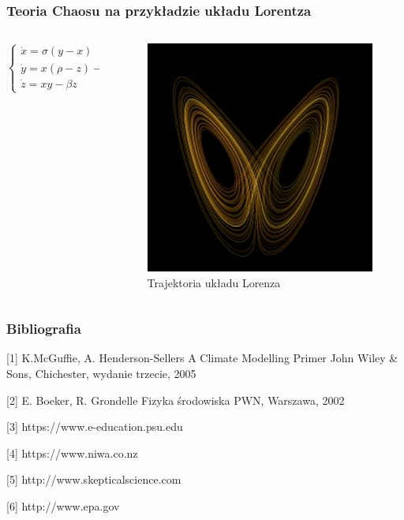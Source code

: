 \documentclass{beamer}
\begin{document}
\begin{frame}
	\frametitle{Teoria Chaosu na przykładzie układu Lorentza}
	\begin{columns}
		\begin{column}{0.5\textwidth}	
			$\begin{cases} \dot{x} = \sigma(y-x)\\ \dot{y} =x(\rho-z)-y \\ \dot{z} = xy-\beta z \end{cases}$
		\end{column}
		\begin{column}{0.5\textwidth}
			\begin{figure}[h]
				\begin{center}
					\includegraphics[width=0.7\linewidth]{images/motyl.png}
					\caption{Trajektoria układu Lorenza}
				\end{center}
			\end{figure}
		\end{column}
		
	\end{columns}
	
\end{frame}



\begin{frame}
	\frametitle{Bibliografia}
	\footnotesize{
		\begin{thebibliography}{99} %
			[1] K.McGuffie, A. Henderson-Sellers
			\newblock A Climate Modelling Primer
			\newblock John Wiley \& Sons, Chichester, wydanie trzecie, 2005
			
			[2] E. Boeker, R. Grondelle
			\newblock Fizyka środowiska
			\newblock PWN, Warszawa, 2002
			
			[3] https://www.e-education.psu.edu
			
			[4] https://www.niwa.co.nz
			
			[5] http://www.skepticalscience.com
			
			[6] http://www.epa.gov
			
		\end{thebibliography}
	}
\end{frame}
\end{document}
